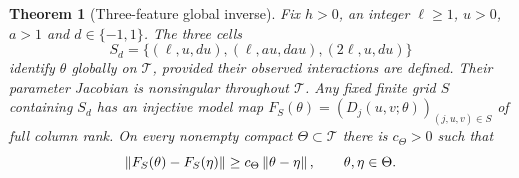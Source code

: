 \documentclass[11pt,a4paper]{article}
\newtheorem{theorem}{Theorem}[section]
\theoremstyle{remark}\newtheorem{remark}[theorem]{Remark}
\begin{document}
\par\medskip\noindent\begin{minipage}{\linewidth}
\begin{theorem}[Three-feature global inverse]\label{thm:three}
Fix $h>0$, an integer $\ell\ge1$, $u>0$, $a>1$ and $d\in\{-1,1\}$. The three cells
\begin{equation}\label{eq:cells}
S_d=\{(\ell,u,du),(\ell,au,dau),(2\ell,u,du)\}
\end{equation}
identify $\theta$ globally on $\mathcal T$, provided their observed interactions are defined. Their parameter Jacobian is nonsingular throughout $\mathcal T$.
Any fixed finite grid $S$ containing $S_d$ has an injective model map
$F_S(\theta)=(D_j(u,v;\theta))_{(j,u,v)\in S}$ of full column rank. On every nonempty compact $\Theta\subset\mathcal T$ there is $c_\Theta>0$ such that
\begin{equation}\label{eq:inversebound}
\left\lVert F_S(\theta)-F_S(\eta)\right\rVert\ge c_\Theta\left\lVert\theta-\eta\right\rVert,\qquad \theta,\eta\in\Theta.
\end{equation}
\end{theorem}
\end{minipage}\par\medskip
\end{document}
